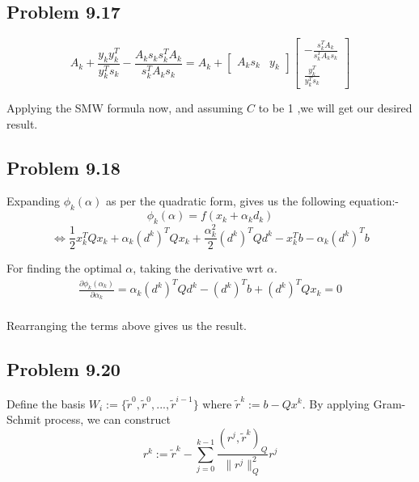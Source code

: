\documentclass[letterpaper,12pt]{article}
\theoremstyle{definition}
\begin{document}
\subsection*{Problem 9.17}
\begin{equation*}
    A_{k}+\frac{y_{k}y_{k}^T}{y_k^Ts_k}-\frac{A_{k}s_ks_k^TA_{k}}{s_k^TA_{k}s_k}=A_k+   \begin{bmatrix}
     A_ks_k & y_k
  \end{bmatrix} \begin{bmatrix}
-\frac{s_k^TA_k}{s_k^TA_ks_k} \\ \frac{y_k^T}{y_k^Ts_k}
\end{bmatrix}
\end{equation*}


\begin{flushleft}
Applying the SMW formula now, and assuming $C$ to be 1 ,we will get our desired result.
\end{flushleft}



\subsection*{Problem 9.18}
Expanding $\phi_k(\alpha)$ as per the quadratic form, gives us the following equation:-
\begin{equation*}
\phi_k(\alpha) = f(x_k + \alpha_k d_k)
\end{equation*}
\begin{equation*}
  \iff \frac{1}{2} x_k^{T} Q x_k + \alpha_k (d^{k})^T Q x_k + \frac{\alpha_k^2}{2} (d^{k})^T Q d^{k} - x_k^Tb - \alpha_k (d^k)^T b  
\end{equation*}

For finding the optimal $\alpha $, taking the derivative wrt $\alpha$. 
\begin{align*}
 \frac{\partial \phi_k(\alpha_k)}{\partial \alpha_k}= 
   \alpha_k (d^{k})^T Q d^k - (d^k)^T b + (d^k)^T Q x_k =0 \\
\end{align*}

\begin{flushleft}
Rearranging the terms above gives us the result.
\end{flushleft}

\subsection*{Problem 9.20}

Define the basis $W_i := \{\tilde{r}^{0}, \tilde{r}^{0}, ..., \tilde{r}^{i-1} \}$ where $\tilde{r}^{k} := b-Qx^{k}$. By applying Gram-Schmit process, we can construct
\begin{equation*}
    r^{k} := \tilde{r}^{k} - \sum_{j=0}^{k-1} \frac{(r^{j},\tilde{r}^{k})_Q}{ \| r^{j}\|_{Q}^{2}} r^j
\end{equation*}
\end{document}
